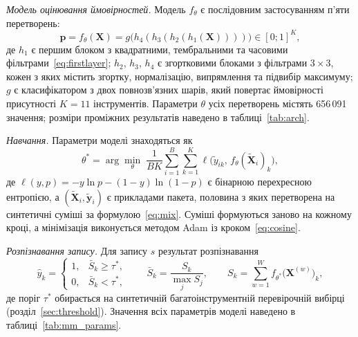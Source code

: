 \textit{Модель оцінювання ймовірностей.} Модель $f_\theta$ є послідовним
застосуванням п'яти перетворень:
\begin{equation}
    \mathbf{p} = f_\theta(\mathbf{X}) = g\big(h_4(h_3(h_2(h_1(\mathbf{X}))))\big) \in [0; 1]^{K},
    \label{eq:mm_comp}
\end{equation}
де $h_1$ є першим блоком з квадратними, тембральними та часовими
фільтрами~\eqref{eq:firstlayer}; $h_2$, $h_3$, $h_4$ є згортковими
блоками з фільтрами $3 \times 3$, кожен з яких містить згортку,
нормалізацію, випрямлення та підвибір максимуму; $g$ є класифікатором з
двох повнозв'язних шарів, який повертає ймовірності присутності $K = 11$
інструментів. Параметри $\theta$ усіх перетворень містять 656\,091
значення; розміри проміжних результатів наведено в
таблиці~\ref{tab:arch}.

\textit{Навчання.} Параметри моделі знаходяться як
\begin{equation}
    \theta^{*} = \arg\min_{\theta}\; \frac{1}{BK} \sum_{i=1}^{B} \sum_{k=1}^{K}
    \ell\big(\widetilde{y}_{ik},\, f_\theta(\widetilde{\mathbf{X}}_i)_k\big),
    \label{eq:mm_loss}
\end{equation}
де $\ell(y, p) = -y \ln p - (1 - y) \ln(1 - p)$ є бінарною перехресною
ентропією, а $(\widetilde{\mathbf{X}}_i, \widetilde{\mathbf{y}}_i)$ є прикладами пакета,
половина з яких перетворена на синтетичні суміші за
формулою~\eqref{eq:mix}. Суміші формуються заново на кожному кроці, а
мінімізація виконується методом Adam із кроком~\eqref{eq:cosine}.

\textit{Розпізнавання запису.} Для запису $s$ результат розпізнавання
\begin{equation}
    \hat{y}_k =
    \begin{cases}
        1, & \bar{S}_k \geq \tau^{*}, \\
        0, & \bar{S}_k < \tau^{*},
    \end{cases}
    \qquad
    \bar{S}_k = \frac{S_k}{\max_j S_j}, \qquad
    S_k = \sum_{w=1}^{W} f_{\theta^{*}}\big(\mathbf{X}^{(w)}\big)_k,
    \label{eq:mm_rec}
\end{equation}
де поріг $\tau^{*}$ обирається на синтетичній багатоінструментній
перевірочній вибірці (розділ~\ref{sec:threshold}). Значення всіх параметрів
моделі наведено в таблиці~\ref{tab:mm_params}.

